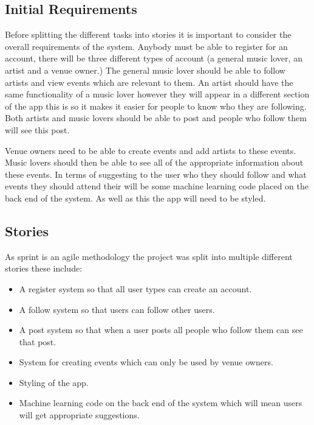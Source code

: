 \subsection{Initial Requirements}
Before splitting the different tasks into stories it is important to consider the overall requirements of the system. Anybody must be able to register for an account, there will be three different types of account (a general music lover, an artist and a venue owner.) The general music lover should be able to follow artists and view events which are relevant to them. An artist should have the same functionality of a music lover however they will appear in a different section of the app this is so it makes it easier for people to know who they are following. Both artists and music lovers should be able to post and people who follow them will see this post.

Venue owners need to be able to create events and add artists to these events. Music lovers should then be able to see all of the appropriate information about these events. In terms of suggesting to the user who they should follow and what events they should attend their will be some machine learning code placed on the back end of the system. As well as this the app will need to be styled.

\subsection{Stories}
As sprint is an agile methodology the project was split into multiple different stories these include:
\begin{itemize}
	\item A register system so that all user types can create an account.
	\item A follow system so that users can follow other users.
	\item A post system so that when a user posts all people who follow them can see that post.
	\item System for creating events which can only be used by venue owners.
	\item Styling of the app.
	\item Machine learning code on the back end of the system which will mean users will get appropriate suggestions.
\end{itemize}